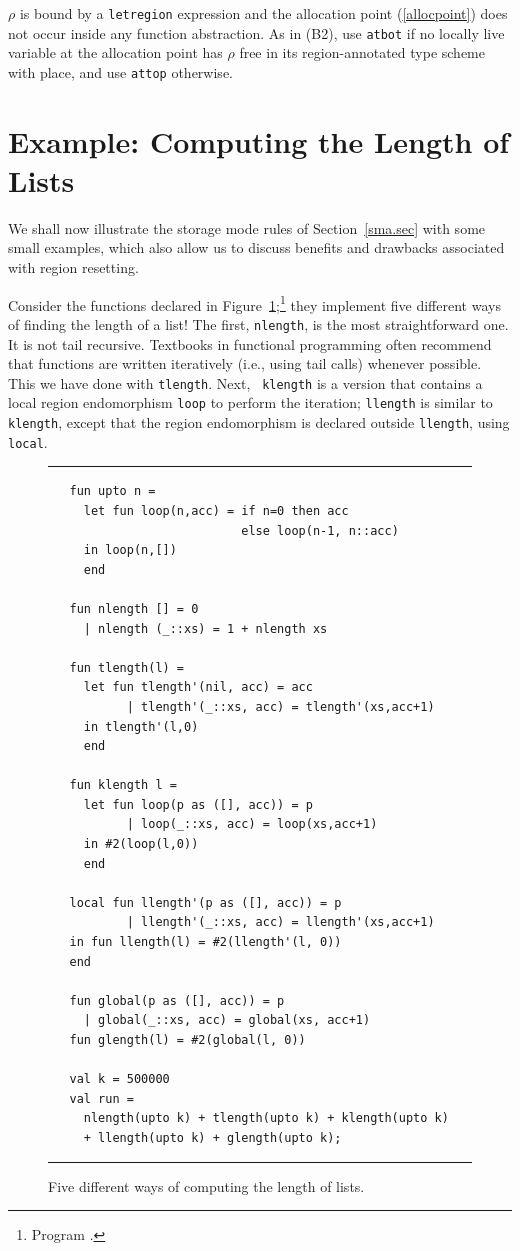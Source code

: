 \documentclass[12pt]{book}
\begin{document}
 $\rho$ is bound by a {\tt letregion} expression
and the allocation point (\ref{allocpoint}) does not occur inside any
function abstraction.  As in (B2), use {\tt atbot} if no locally live
variable at the allocation point has $\rho$ free in its
region-annotated type scheme with place, and use {\tt attop}
otherwise.


\section{Example: Computing the Length of Lists}
\label{length.sec}
We shall now illustrate the storage mode rules of
Section~\ref{sma.sec} with some small examples, which also allow us to
discuss benefits and drawbacks associated with region resetting.

Consider the functions declared in
Figure~\ref{length.fig};\footnote{Program .}
they implement five different ways of finding the length of a list!
The first, {\tt nlength}, is the most straightforward one.  It is not
tail recursive. Textbooks in functional programming often recommend
that functions are written iteratively (i.e., using tail calls)
whenever possible. This we have done with {\tt tlength}.  Next, {\tt
  klength} is a version that contains a local
%
region endomorphism {\tt loop} to perform the iteration; {\tt llength}
is similar to {\tt klength}, except that the region endomorphism is
declared outside {\tt llength}, using 
%
{\tt local}.
\begin{figure}
\hrule
\medskip
\begin{verbatim}
   fun upto n = 
     let fun loop(n,acc) = if n=0 then acc
                           else loop(n-1, n::acc)
     in loop(n,[])
     end

   fun nlength [] = 0
     | nlength (_::xs) = 1 + nlength xs

   fun tlength(l) =
     let fun tlength'(nil, acc) = acc
           | tlength'(_::xs, acc) = tlength'(xs,acc+1)
     in tlength'(l,0)
     end

   fun klength l =
     let fun loop(p as ([], acc)) = p
           | loop(_::xs, acc) = loop(xs,acc+1)
     in #2(loop(l,0))
     end

   local fun llength'(p as ([], acc)) = p
           | llength'(_::xs, acc) = llength'(xs,acc+1)
   in fun llength(l) = #2(llength'(l, 0))
   end

   fun global(p as ([], acc)) = p
     | global(_::xs, acc) = global(xs, acc+1)
   fun glength(l) = #2(global(l, 0))

   val k = 500000
   val run = 
     nlength(upto k) + tlength(upto k) + klength(upto k) 
     + llength(upto k) + glength(upto k);
\end{verbatim}
\caption{Five different ways of computing the length of lists.}
\bigskip
\label{length.fig}
\hrule
\end{figure}
\end{document}
